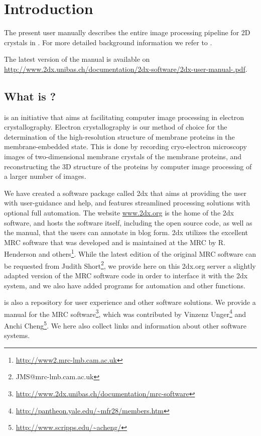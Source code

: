 \section{Introduction}

The present user manually describes the entire image processing pipeline for 2D crystals in {\twodx}. For more detailed background information we refer to \cite{marheit1, marheit2, marheit3}.

The latest version of the manual is available on \url{http://www.2dx.unibas.ch/documentation/2dx-software/2dx-user-manual-.pdf}.

\subsection{What is {\twodx}?}

{\twodx} \cite{2dx_1, 2dx_2} is an initiative that aims at facilitating computer image processing in electron crystallography. Electron crystallography is our method of choice for the determination of the high-resolution structure of membrane proteins in the membrane-embedded state. This is done by recording cryo-electron microscopy images of two-dimensional membrane crystals of the membrane proteins, and reconstructing the 3D structure of the proteins by computer image processing of a larger number of images. 

We have created a software package called 2dx that aims at providing the user with user-guidance and help, and features streamlined processing solutions with optional full automation. The website \url{www.2dx.org} is the home of the 2dx software, and hosts the software itself, including the open source code, as well as the manual, that the users can annotate in blog form. 
2dx utilizes the excellent MRC software that was developed and is maintained at the MRC by R. Henderson and others\footnote{\url{http://www2.mrc-lmb.cam.ac.uk}}. While the latest edition of the original MRC software can be requested from Judith Short\footnote{JMS@mrc-lmb.cam.ac.uk}, we provide here on this 2dx.org server a slightly adapted version of the MRC software code in order to interface it with the 2dx system, and we also have added programs for automation and other functions. 

{\twodx} is also a repository for user experience and other software solutions. We provide a manual for the MRC software\footnote{\url{http://www.2dx.unibas.ch/documentation/mrc-software}}, which was contributed by Vinzenz Unger\footnote{\url{http://pantheon.yale.edu/~mfr28/members.htm}} and Anchi Cheng\footnote{\url{http://www.scripps.edu/~acheng/}}. We here also collect links and information about other software systems.

